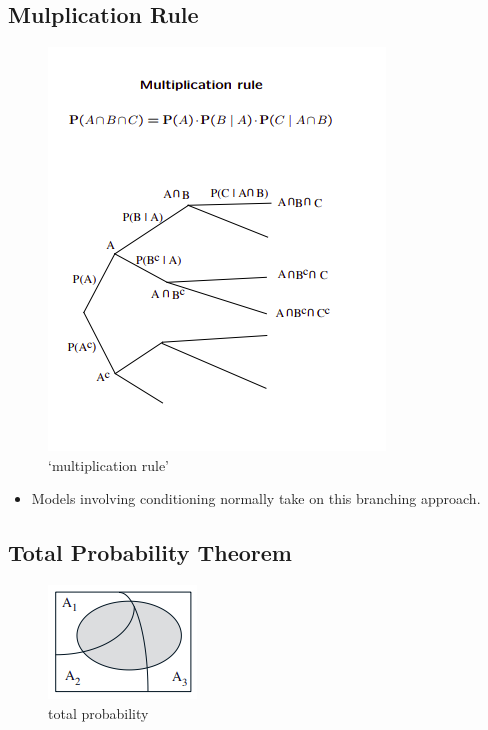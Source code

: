 \documentclass[11pt]{article}
\begin{document}
\hypertarget{mulplication-rule}{%
\subsection{Mulplication Rule}\label{mulplication-rule}}

\begin{figure}
\centering
\includegraphics{img/multiplicationrule.png}
\caption{`multiplication rule'}
\end{figure}

\begin{itemize}
\tightlist
\item
  Models involving conditioning normally take on this branching
  approach.
\end{itemize}

\hypertarget{total-probability-theorem}{%
\subsection{Total Probability Theorem}\label{total-probability-theorem}}

\begin{figure}
\centering
\includegraphics{img/totalprobailitytheorem.png}
\caption{total probability}
\end{figure}
\end{document}
